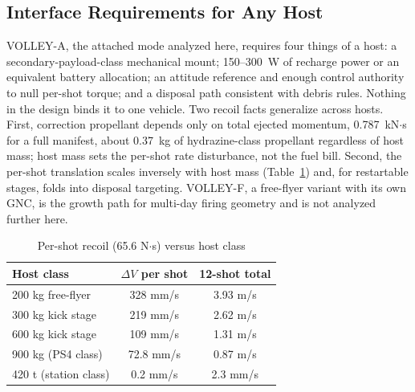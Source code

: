 \documentclass[conference]{IEEEtran}
\begin{document}
\subsection{Interface Requirements for Any Host}
VOLLEY-A, the attached mode analyzed here, requires four things of a host: a secondary-payload-class mechanical mount; 150--300~W of recharge power or an equivalent battery allocation; an attitude reference and enough control authority to null per-shot torque; and a disposal path consistent with debris rules. Nothing in the design binds it to one vehicle. Two recoil facts generalize across hosts. First, correction propellant depends only on total ejected momentum, 0.787~kN$\cdot$s for a full manifest, about 0.37~kg of hydrazine-class propellant regardless of host mass; host mass sets the per-shot rate disturbance, not the fuel bill. Second, the per-shot translation scales inversely with host mass (Table~\ref{tab:recoil}) and, for restartable stages, folds into disposal targeting. VOLLEY-F, a free-flyer variant with its own GNC, is the growth path for multi-day firing geometry and is not analyzed further here.

\begin{table}[t]
\caption{Per-shot recoil (65.6 N$\cdot$s) versus host class}
\label{tab:recoil}
\centering\footnotesize
\begin{tabular}{lcc}
\toprule
Host class & $\Delta V$ per shot & 12-shot total\\
\midrule
200 kg free-flyer & 328 mm/s & 3.93 m/s\\
300 kg kick stage & 219 mm/s & 2.62 m/s\\
600 kg kick stage & 109 mm/s & 1.31 m/s\\
900 kg (PS4 class) & 72.8 mm/s & 0.87 m/s\\
420 t (station class) & 0.2 mm/s & 2.3 mm/s\\
\bottomrule
\end{tabular}
\end{table}
\end{document}
